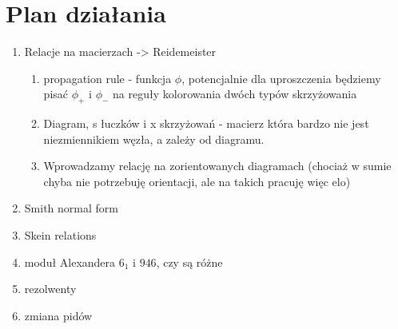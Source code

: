 \section*{Plan działania}

\begin{enumerate}
  \item Relacje na macierzach -> Reidemeister
    \begin{enumerate}
      \item propagation rule - funkcja $\phi$, potencjalnie dla uproszczenia będziemy pisać $\phi_+$ i $\phi_-$ na reguły kolorowania dwóch typów skrzyżowania
      \item Diagram, s łuczków i x skrzyżowań - macierz która bardzo nie jest niezmiennikiem węzła, a zależy od diagramu.
      \item Wprowadzamy relację na zorientowanych diagramach (chociaż w sumie chyba nie potrzebuję orientacji, ale na takich pracuję więc elo)
    \end{enumerate}
  \item Smith normal form 
  \item Skein relations
  \item moduł Alexandera $6_1$ i $9{46}$, czy są różne
  \item rezolwenty
  \item zmiana pidów
\end{enumerate}
